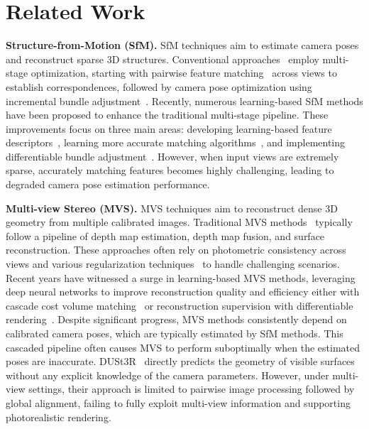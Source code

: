 \section{Related Work}\label{sec::related}


\noindent\textbf{Structure-from-Motion (SfM).} SfM techniques aim to estimate camera poses and reconstruct sparse 3D structures.
Conventional approaches~\citep{schonberger2016structure, snavely2006photo} employ multi-stage optimization, starting with pairwise feature matching~\citep{matas2004robust, bay2006surf, lowe2004distinctive} across views to establish correspondences, followed by camera pose optimization using incremental bundle adjustment~\citep{triggs2000bundle}.
Recently, numerous learning-based SfM methods have been proposed to enhance the traditional multi-stage pipeline. These improvements focus on three main areas: developing learning-based feature descriptors~\citep{detone2018superpoint, dusmanu2019d2, yi2016lift}, learning more accurate matching algorithms~\citep{sun2021loftr, sarlin2020superglue}, and implementing differentiable bundle adjustment~\citep{wang2023visual, lin2021barf}.
%
However, when input views are extremely sparse, accurately matching features becomes highly challenging, leading to degraded camera pose estimation performance.

\noindent\textbf{Multi-view Stereo (MVS).}
MVS techniques aim to reconstruct dense 3D geometry from multiple calibrated images. Traditional MVS methods~\citep{galliani2015massively, schonberger2016pixelwise, furukawa2015multi} typically follow a pipeline of depth map estimation, depth map fusion, and surface reconstruction. These approaches often rely on photometric consistency across views and various regularization techniques~\citep{yao2019recurrent} to handle challenging scenarios.
Recent years have witnessed a surge in learning-based MVS methods, leveraging deep neural networks to improve reconstruction quality and efficiency either with cascade cost volume matching~\citep{yao2018mvsnet, yao2019recurrent} or reconstruction supervision with differentiable rendering~\citep{chen2021mvsnerf, chen2024mvsplat, charatan2024pixelsplat, xu2024grm, hong2023lrm, li2023instant3d}.
Despite significant progress, MVS methods consistently depend on calibrated camera poses, which are typically estimated by SfM methods. This cascaded pipeline often causes MVS to perform suboptimally when the estimated poses are inaccurate.
DUSt3R~\citep{wang2024dust3r, leroy2024grounding} directly predicts the geometry of visible surfaces without any explicit knowledge of the camera parameters. However, under multi-view settings, their approach is limited to pairwise image processing followed by global alignment, failing to fully exploit multi-view information and supporting photorealistic rendering.


